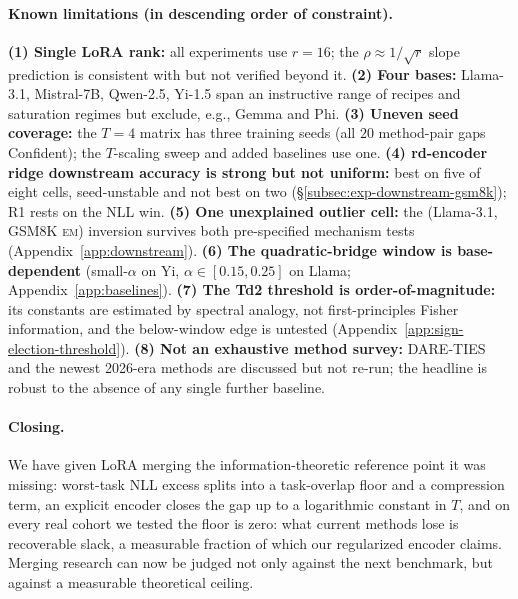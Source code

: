 \paragraph{Known limitations (in descending order of constraint).}
\textbf{(1) Single LoRA rank:} all experiments use $r = 16$; the
$\rho \approx 1/\sqrt{r}$ slope prediction is consistent with but not
verified beyond it.
\textbf{(2) Four bases:} Llama-3.1, Mistral-7B, Qwen-2.5, Yi-1.5 span
an instructive range of recipes and saturation regimes but exclude,
e.g., Gemma and Phi.
\textbf{(3) Uneven seed coverage:} the $T = 4$ matrix has three
training seeds (all $20$ method-pair gaps Confident); the $T$-scaling
sweep and added baselines use one.
\textbf{(4) rd-encoder ridge downstream accuracy is strong but not
uniform:} best on five of eight cells, seed-unstable and not best on
two (\S\ref{subsec:exp-downstream-gsm8k}); R1 rests on the NLL win.
\textbf{(5) One unexplained outlier cell:} the (Llama-3.1, GSM8K
\textsc{em}) inversion survives both pre-specified mechanism tests
(Appendix~\ref{app:downstream}).
\textbf{(6) The quadratic-bridge window is base-dependent}
(small-$\alpha$ on Yi, $\alpha \in [0.15, 0.25]$ on Llama;
Appendix~\ref{app:baselines}).
\textbf{(7) The Td2 threshold is order-of-magnitude:} its constants
are estimated by spectral analogy, not first-principles Fisher
information, and the below-window edge is untested
(Appendix~\ref{app:sign-election-threshold}).
\textbf{(8) Not an exhaustive method survey:} DARE-TIES and the newest
2026-era methods are discussed but not re-run; the headline is robust
to the absence of any single further baseline.

\paragraph{Closing.} We have given LoRA merging the
information-theoretic reference point it was missing: worst-task NLL
excess splits into a task-overlap floor and a compression term, an
explicit encoder closes the gap up to a logarithmic constant in $T$,
and on every real cohort we tested the floor is zero: what current
methods lose is recoverable slack, a measurable fraction of which our
regularized encoder claims. Merging research can now be judged not
only against the next benchmark, but against a measurable theoretical
ceiling.

